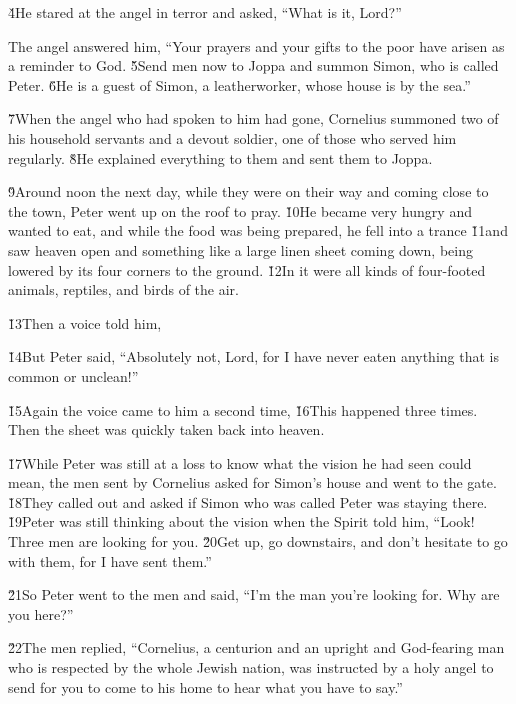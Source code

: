 \v{4}He stared at the angel in terror and asked, ``What is it, Lord?''

The angel answered him, ``Your prayers and your gifts to the poor have arisen as a reminder to God. \v{5}Send men now to Joppa and summon Simon, who is called Peter. \v{6}He is a guest of Simon, a leatherworker, whose house is by the sea.''

\v{7}When the angel who had spoken to him had gone, Cornelius summoned two of his household servants and a devout soldier, one of those who served him regularly. \v{8}He explained everything to them and sent them to Joppa.

\v{9}Around noon the next day, while they were on their way and coming close to the town, Peter went up on the roof to pray. \v{10}He became very hungry and wanted to eat, and while the food was being prepared, he fell into a trance \v{11}and saw heaven open and something like a large linen sheet coming down, being lowered by its four corners to the ground. \v{12}In it were all kinds of four-footed animals, reptiles, and birds of the air.

\v{13}Then a voice told him, 

\v{14}But Peter said, ``Absolutely not, Lord, for I have never eaten anything that is common or unclean!''

\v{15}Again the voice came to him a second time,  \v{16}This happened three times. Then the sheet was quickly taken back into heaven.

\v{17}While Peter was still at a loss to know what the vision he had seen could mean, the men sent by Cornelius asked for Simon's house and went to the gate. \v{18}They called out and asked if Simon who was called Peter was staying there. \v{19}Peter was still thinking about the vision when the Spirit told him, ``Look! Three men are looking for you. \v{20}Get up, go downstairs, and don't hesitate to go with them, for I have sent them.''

\v{21}So Peter went to the men and said, ``I'm the man you're looking for. Why are you here?''

\v{22}The men replied, ``Cornelius, a centurion and an upright and God-fearing man who is respected by the whole Jewish nation, was instructed by a holy angel to send for you to come to his home to hear what you have to say.''

